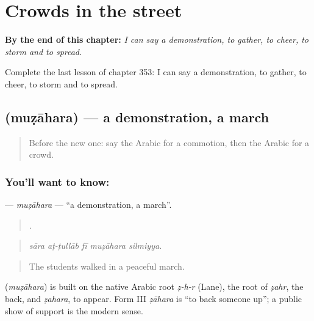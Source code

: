 
\chapter{Crowds in the street}
\label{ch:ar-crowds-in-the-street}

\begin{chapteropening}
\textbf{By the end of this chapter:} \emph{I can say a demonstration, to gather, to cheer, to storm and to spread.}

Complete the last lesson of chapter 353: I can say a demonstration, to gather, to cheer, to storm and to spread.
\end{chapteropening}

\section[\texorpdfstring{\ar{مظاهرة} (muẓāhara)}{مظاهرة (muẓāhara)}]{ (muẓāhara) — a demonstration, a march}

\label{lesson:AR-C353-muzahara}



\begin{quote}
Before the new one: say the Arabic for a commotion, then the Arabic for a crowd.
\end{quote}

\subsection*{You'll want to know: }
\textbf{} — \emph{muẓāhara} — \textquotedblleft{}a demonstration, a march\textquotedblright{}.

\begin{quote}
    .
\end{quote}

\begin{quote}
\emph{sāra aṭ-ṭullāb fī muẓāhara silmiyya.}
\end{quote}

\begin{quote}
The students walked in a peaceful march.
\end{quote}

\begin{cousinweb}
\textbf{} (\emph{muẓāhara}) is built on the native Arabic root \emph{ẓ-h-r} (Lane), the root of \emph{ẓahr}, the back, and \emph{ẓahara}, to appear. Form III \emph{ẓāhara} is \textquotedblleft{}to back someone up\textquotedblright{}; a public show of support is the modern sense.
\end{cousinweb}

